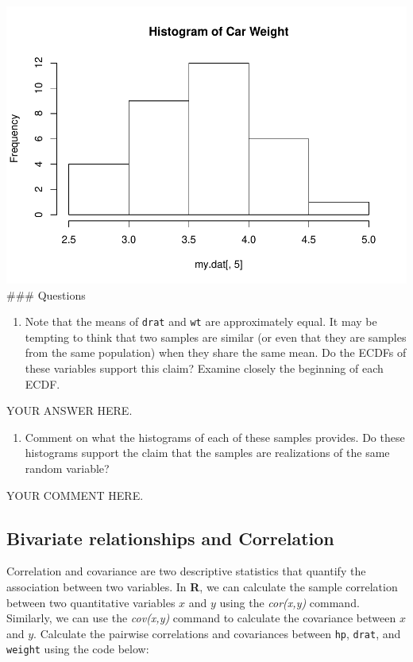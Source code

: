 \documentclass[
]{article}
\providecommand{\tightlist}{%
  \setlength{\itemsep}{0pt}\setlength{\parskip}{0pt}}
\begin{document}
\includegraphics{CA2_DataAnalysis_files/figure-latex/unnamed-chunk-15-3.pdf}
\#\#\# Questions

\begin{enumerate}
\def\labelenumi{\arabic{enumi}.}
\tightlist
\item
  Note that the means of \texttt{drat} and \texttt{wt} are approximately
  equal. It may be tempting to think that two samples are similar (or
  even that they are samples from the same population) when they share
  the same mean. Do the ECDFs of these variables support this claim?
  Examine closely the beginning of each ECDF.
\end{enumerate}

YOUR ANSWER HERE.

\begin{enumerate}
\def\labelenumi{\arabic{enumi}.}
\setcounter{enumi}{1}
\tightlist
\item
  Comment on what the histograms of each of these samples provides. Do
  these histograms support the claim that the samples are realizations
  of the same random variable?
\end{enumerate}

YOUR COMMENT HERE.

\hypertarget{bivariate-relationships-and-correlation}{%
\subsection{Bivariate relationships and
Correlation}\label{bivariate-relationships-and-correlation}}

Correlation and covariance are two descriptive statistics that quantify
the association between two variables. In \textbf{R}, we can calculate
the sample correlation between two quantitative variables \(x\) and
\(y\) using the \emph{cor(x,y)} command. Similarly, we can use the
\emph{cov(x,y)} command to calculate the covariance between \(x\) and
\(y\). Calculate the pairwise correlations and covariances between
\texttt{hp}, \texttt{drat}, and \texttt{weight} using the code below:
\end{document}
